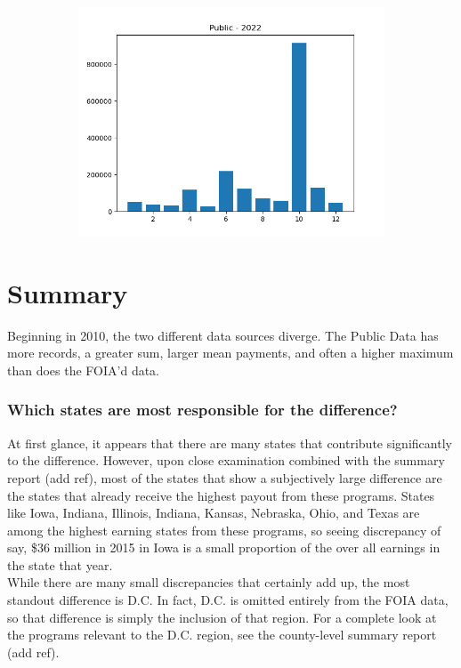 \documentclass{article}
\begin{document}
\begin{figure}[H]
\begin{subfigure}{.5\textwidth}
        \includegraphics[width=\textwidth]{../../output/figures/annual_source_distribution/Public_data_dist_2022.png}
    \end{subfigure}
\end{figure}

\newpage 
\section*{Summary}
Beginning in 2010, the two different data sources diverge. The Public Data
has more records, a greater sum, larger mean payments, and often a higher maximum than does the 
FOIA'd data. 

\subsubsection*{Which states are most responsible for the difference?}
At first glance, it appears that there are many states that contribute significantly to the difference. However, upon close examination 
combined with the summary report (add ref), most of the states that show a subjectively large difference are the states that already receive the highest payout 
from these programs. States like Iowa, Indiana, Illinois, Indiana, Kansas, Nebraska, Ohio, and Texas are among the highest earning 
states from these programs, so seeing discrepancy of say, \$36 million in 2015 in Iowa is a small proportion of the over all earnings 
in the state that year. \\

While there are many small discrepancies that certainly add up, the most standout difference is D.C. 
In fact, D.C. is omitted entirely from the FOIA data, so that difference is simply the inclusion of that region.
For a complete look at the programs relevant to the D.C. region, see the county-level summary report (add ref).
\end{document}
